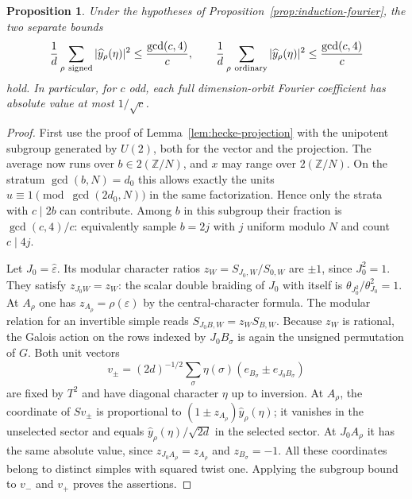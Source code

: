 \documentclass[11pt,a4paper]{article}
\newtheorem{proposition}[theorem]{Proposition}
\numberwithin{equation}{section}
\begin{document}
\begin{proposition}\label{prop:parity-fourier}
Under the hypotheses of Proposition~\ref{prop:induction-fourier}, the two
separate bounds
\[
 \frac1d\sum_{\rho\ {\rm signed}}|\widehat y_\rho(\eta)|^2\le
 \frac{\gcd(c,4)}{c},\qquad
 \frac1d\sum_{\rho\ {\rm ordinary}}|\widehat y_\rho(\eta)|^2\le
 \frac{\gcd(c,4)}{c}
\]
hold. In particular, for $c$ odd, each full dimension-orbit Fourier
coefficient has absolute value at most $1/\sqrt c$.
\end{proposition}
\begin{proof}
First use the proof of Lemma~\ref{lem:hecke-projection} with the
unipotent subgroup generated by $U(2)$, both for the vector and the
projection. The average now runs over $b\in2(\mathbb Z/N)$, and $x$
may range over $2(\mathbb Z/N)$. On the stratum $\gcd(b,N)=d_0$ this
allows exactly the units $u\equiv1\pmod{\gcd(2d_0,N)}$ in the same
factorization. Hence only the strata with $c\mid 2b$ can contribute.
Among $b$ in this subgroup their fraction is $\gcd(c,4)/c$: equivalently
sample $b=2j$ with $j$ uniform modulo $N$ and count $c\mid4j$.

Let $J_0=\widehat\varepsilon$. Its modular character ratios
$z_W=S_{J_0,W}/S_{0,W}$ are $\pm1$, since $J_0^2=1$. They satisfy
$z_{J_0 W}=z_W$: the scalar double braiding of $J_0$ with itself is
$\theta_{J_0^2}/\theta_{J_0}^2=1$. At $A_\rho$ one has
$z_{A_\rho}=\rho(\varepsilon)$ by the central-character formula.
The modular relation for an invertible simple reads
$S_{J_0B,W}=z_W S_{B,W}$. Because $z_W$ is rational, the Galois action
on the rows indexed by $J_0B_\sigma$ is again the unsigned permutation
of $G$. Both unit vectors
\[
 v_\pm=(2d)^{-1/2}\sum_\sigma\eta(\sigma)
    (e_{B_\sigma}\pm e_{J_0B_\sigma})
\]
are fixed by $T^2$ and have diagonal character $\eta$ up to inversion.
At $A_\rho$, the coordinate of $Sv_\pm$ is proportional to
$(1\pm z_{A_\rho})\widehat y_\rho(\eta)$; it vanishes in the
unselected sector and equals $\widehat y_\rho(\eta)/\sqrt{2d}$ in the
selected sector. At $J_0 A_\rho$ it has the same absolute value, since
$z_{J_0 A_\rho}=z_{A_\rho}$ and $z_{B_\sigma}=-1$. All these coordinates
belong to distinct simples with squared twist one. Applying the subgroup
bound to $v_-$ and $v_+$ proves the assertions.
\end{proof}
\end{document}
